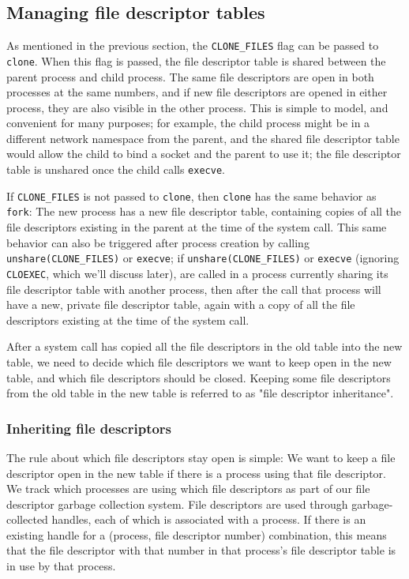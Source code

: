 \documentclass{acmart}
\begin{document}
\subsection{Managing file descriptor tables}\label{fdtables}
As mentioned in the previous section,
the \verb|CLONE_FILES| flag can be passed to \texttt{clone}.
When this flag is passed,
the file descriptor table is shared between the parent process and child process.
The same file descriptors are open in both processes at the same numbers,
and if new file descriptors are opened in either process,
they are also visible in the other process.
This is simple to model,
and convenient for many purposes;
for example, the child process might be in a different network namespace from the parent,
and the shared file descriptor table would allow the child to bind a socket
and the parent to use it;
the file descriptor table is unshared once the child calls \texttt{execve}.

If \verb|CLONE_FILES| is not passed to \texttt{clone},
then \texttt{clone} has the same behavior as \texttt{fork}:
The new process has a new file descriptor table,
containing copies of all the file descriptors existing in the parent at the time of the system call.
This same behavior can also be triggered after process creation by calling \verb|unshare(CLONE_FILES)| or \texttt{execve};
if \verb|unshare(CLONE_FILES)| or \texttt{execve} (ignoring \texttt{CLOEXEC}, which we'll discuss later),
are called in a process currently sharing its file descriptor table with another process,
then after the call that process will have a new, private file descriptor table,
again with a copy of all the file descriptors existing at the time of the system call.

After a system call has copied all the file descriptors in the old table into the new table,
we need to decide which file descriptors we want to keep open in the new table,
and which file descriptors should be closed.
Keeping some file descriptors from the old table in the new table
is referred to as "file descriptor inheritance".
\subsubsection{Inheriting file descriptors}
The rule about which file descriptors stay open is simple:
We want to keep a file descriptor open in the new table
if there is a process using that file descriptor.
We track which processes are using which file descriptors as part of our file descriptor garbage collection system.
File descriptors are used through garbage-collected handles,
each of which is associated with a process.
If there is an existing handle for a (process, file descriptor number) combination,
this means that the file descriptor with that number in that process's file descriptor table is in use by that process.
\end{document}
